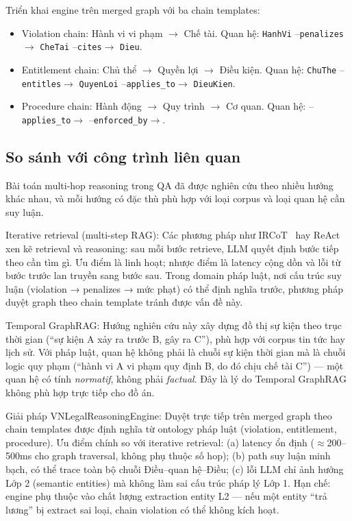 \documentclass[../DoAn.tex]{subfiles}
\begin{document}
Triển khai engine trên merged graph với ba chain templates:

\begin{itemize}[nosep, leftmargin=*]
    \item Violation chain: Hành vi vi phạm $\rightarrow$ Chế tài. Quan hệ: \texttt{HanhVi} --\texttt{penalizes}$\rightarrow$ \texttt{CheTai} --\texttt{cites}$\rightarrow$ \texttt{Dieu}.
    
    \item Entitlement chain: Chủ thể $\rightarrow$ Quyền lợi $\rightarrow$ Điều kiện. Quan hệ: \texttt{ChuThe} --\texttt{entitles}$\rightarrow$ \texttt{QuyenLoi} --\texttt{applies\_to}$\rightarrow$ \texttt{DieuKien}.
    
    \item Procedure chain: Hành động $\rightarrow$ Quy trình $\rightarrow$ Cơ quan. Quan hệ: --\texttt{applies\_to}$\rightarrow$ --\texttt{enforced\_by}$\rightarrow$.
\end{itemize}

\subsection{So sánh với công trình liên quan}
\label{subsection:5.2.3}

Bài toán multi-hop reasoning trong QA đã được nghiên cứu theo nhiều hướng khác nhau, và mỗi hướng có đặc thù phù hợp với loại corpus và loại quan hệ cần suy luận.

Iterative retrieval (multi-step RAG): Các phương pháp như IRCoT~\cite{trivedi2022ircot} hay ReAct xen kẽ retrieval và reasoning: sau mỗi bước retrieve, LLM quyết định bước tiếp theo cần tìm gì. Ưu điểm là linh hoạt; nhược điểm là latency cộng dồn và lỗi từ bước trước lan truyền sang bước sau. Trong domain pháp luật, nơi cấu trúc suy luận (violation → penalizes → mức phạt) có thể định nghĩa trước, phương pháp duyệt graph theo chain template tránh được vấn đề này.

Temporal GraphRAG: Hướng nghiên cứu này xây dựng đồ thị sự kiện theo trục thời gian (``sự kiện A xảy ra trước B, gây ra C''), phù hợp với corpus tin tức hay lịch sử. Với pháp luật, quan hệ không phải là chuỗi sự kiện thời gian mà là chuỗi logic quy phạm (``hành vi A vi phạm quy định B, do đó chịu chế tài C'') --- một quan hệ có tính \emph{normatif}, không phải \emph{factual}. Đây là lý do Temporal GraphRAG không phù hợp trực tiếp cho đồ án.

Giải pháp VNLegalReasoningEngine: Duyệt trực tiếp trên merged graph theo chain templates được định nghĩa từ ontology pháp luật (violation, entitlement, procedure). Ưu điểm chính so với iterative retrieval: (a) latency ổn định ($\approx$200--500ms cho graph traversal, không phụ thuộc số hop); (b) path suy luận minh bạch, có thể trace toàn bộ chuỗi Điều--quan hệ--Điều; (c) lỗi LLM chỉ ảnh hưởng Lớp 2 (semantic entities) mà không làm sai cấu trúc pháp lý Lớp 1. Hạn chế: engine phụ thuộc vào chất lượng extraction entity L2 --- nếu một entity ``trả lương'' bị extract sai loại, chain violation có thể không kích hoạt.
\end{document}

